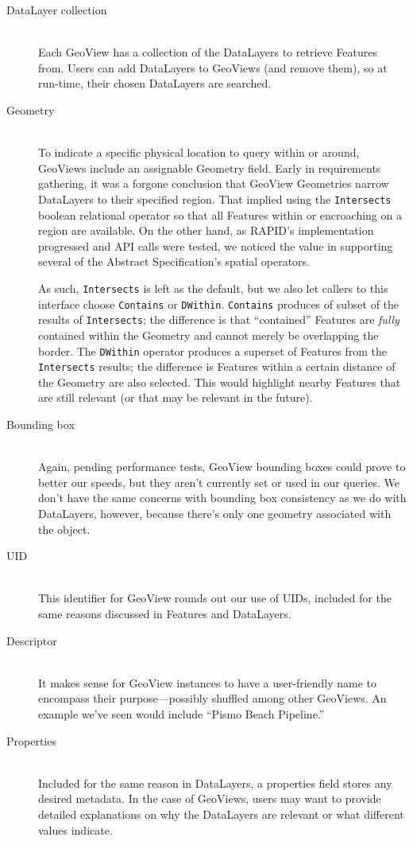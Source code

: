 \begin{description}

\item[DataLayer collection] \hfill \\
Each GeoView has a collection of the DataLayers to retrieve Features from. Users can add DataLayers to GeoViews (and remove them), so at run-time, their chosen DataLayers are searched.

\item[Geometry] \hfill \\
To indicate a specific physical location to query within or around, GeoViews include an assignable Geometry field. Early in requirements gathering, it was a forgone conclusion that GeoView Geometries narrow DataLayers to their specified region. That implied using the \texttt{Intersects} boolean relational operator so that all Features within or encroaching on a region are available. On the other hand, as RAPID's implementation progressed and API calls were tested, we noticed the value in supporting several of the Abstract Specification's spatial operators.

As such, \texttt{Intersects} is left as the default, but we also let callers to this interface choose \texttt{Contains} or \texttt{DWithin}. \texttt{Contains} produces of subset of the results of \texttt{Intersects}; the difference is that ``contained'' Features are \textit{fully} contained within the Geometry and cannot merely be overlapping the border. The \texttt{DWithin} operator produces a superset of Features from the \texttt{Intersects} results; the difference is Features within a certain distance of the Geometry are also selected. This would highlight nearby Features that are still relevant (or that may be relevant in the future).

\item[Bounding box] \hfill \\
Again, pending performance tests, GeoView bounding boxes could prove to better our speeds, but they aren't currently set or used in our queries. We don't have the same concerns with bounding box consistency as we do with DataLayers, however, because there's only one geometry associated with the object.

\item[UID] \hfill \\
This identifier for GeoView rounds out our use of UIDs, included for the same reasons discussed in Features and DataLayers.

\item[Descriptor] \hfill \\
It makes sense for GeoView instances to have a user-friendly name to encompass their purpose---possibly shuffled among other GeoViews. An example we've seen would include ``Pismo Beach Pipeline.''

\item[Properties] \hfill \\
Included for the same reason in DataLayers, a properties field stores any desired metadata. In the case of GeoViews, users may want to provide detailed explanations on why the DataLayers are relevant or what different values indicate.

\end{description}

